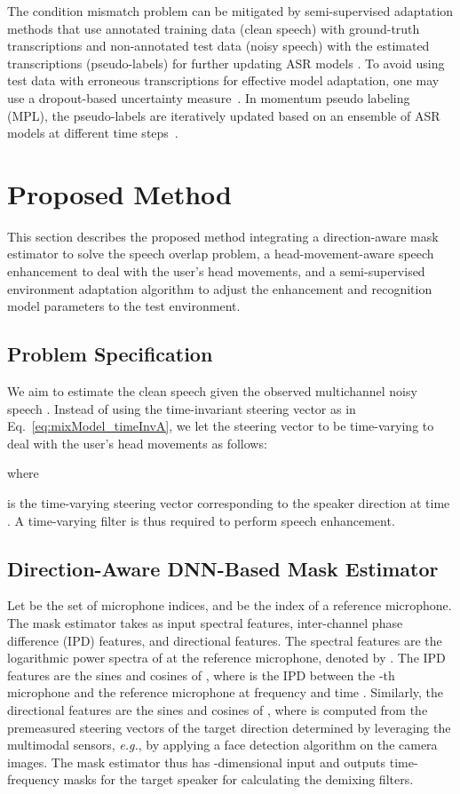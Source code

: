 \documentclass[a4paper]{article}
\newcommand{\eg}{\textit{e.g.}}
\begin{document}
The condition mismatch problem
 can be mitigated by semi-supervised adaptation methods
 that use annotated training data (clean speech) with ground-truth transcriptions
 and non-annotated test data (noisy speech) with the estimated transcriptions (pseudo-labels) 
 for further updating ASR models
 \cite{weninger20_interspeech,DBLP:journals/corr/abs-2010-15653,
 xu20b_interspeech,park20d_interspeech}.
To avoid using test data with erroneous transcriptions 
 for effective model adaptation,
 one may use a dropout-based uncertainty measure~\cite{DBLP:conf/icassp/KhuranaMHR21}.
In momentum pseudo labeling (MPL),
 the pseudo-labels are iteratively updated based on an ensemble of ASR models 
 at different time steps~\cite{higuchi21_interspeech}.

\section{Proposed Method}
\label{sec:proposed_method}
This section
describes the proposed method
integrating
a direction-aware mask estimator to solve the speech overlap problem,
a head-movement-aware speech enhancement to deal with the user's head movements,
and a semi-supervised environment adaptation algorithm
to adjust the enhancement and recognition model parameters to the test environment.

\subsection{Problem Specification}

We aim to estimate the clean speech 
given the observed multichannel noisy speech .
Instead of using the time-invariant steering vector as in Eq.~\eqref{eq:mixModel_timeInvA},
we let the steering vector to be time-varying to deal with the user's head movements as follows:

where

is the time-varying steering vector corresponding to the speaker direction at time .
A time-varying filter  is thus required to perform speech enhancement.

\subsection{Direction-Aware DNN-Based Mask Estimator} \label{sec:mask_estimator}

Let  
 be the set of microphone indices,
 and  be the index of a reference microphone.
The mask estimator takes as input
 spectral features, inter-channel phase difference (IPD) features, and directional features.
The spectral features are the logarithmic power spectra of  at the reference microphone,
 denoted by .
The IPD features are the sines and cosines 
 of ,
 where  
 is the IPD between the -th microphone and the reference microphone 
 at frequency  and time .
Similarly, the directional features are the sines and cosines 
 of ,
 where  is
 computed from the premeasured steering vectors of the target direction
determined by leveraging the multimodal sensors,
\eg, by applying a face detection algorithm on the camera images.
The mask estimator thus has -dimensional input
 and outputs time-frequency masks  for the target speaker 
 for calculating the demixing filters.
\end{document}
